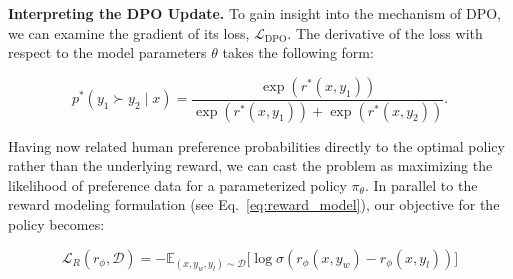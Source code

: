 \textbf{Interpreting the DPO Update.} To gain insight into the mechanism of DPO, we can examine the gradient of its loss, $\mathcal{L}_\text{DPO}$. The derivative of the loss with respect to the model parameters $\theta$ takes the following form:

\begin{equation}\label{eq:bradley-terry}
    p^*(y_1\succ y_2 \mid x)=\frac{\exp\left(r^*(x, y_1)\right)}{\exp\left(r^*(x, y_1)\right) + \exp\left(r^*(x, y_2)\right)}.
\end{equation}

Having now related human preference probabilities directly to the optimal policy rather than the underlying reward, we can cast the problem as maximizing the likelihood of preference data for a parameterized policy $\pi_\theta$. In parallel to the reward modeling formulation (see Eq.~\ref{eq:reward_model}), our objective for the policy becomes:

\begin{equation}\label{eq:reward_model}
    \mathcal{L}_R(r_{\phi}, \mathcal{D}) = -\mathbb{E}_{(x, y_w, y_l)\sim \mathcal{D}}\bigl[\log \sigma(r_{\phi}(x, y_w)- r_{\phi}(x, y_l))\bigr]
\end{equation}


